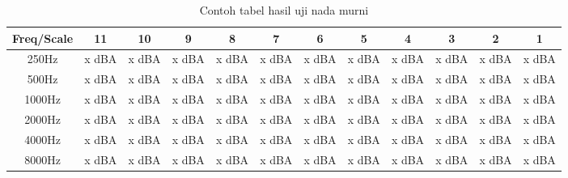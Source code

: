 \documentclass[12pt]{book}
\begin{document}
	\begin{table}[!ht]
		\centering
		\begin{tabular}{|c|c|c|c|c|c|c|c|c|c|c|c|}
			\hline
			Freq/Scale & 11 & 10 & 9 & 8 & 7 & 6 & 5 & 4 & 3 & 2 & 1\\ [0.5ex]
			\hline\hline
			250Hz & x dBA & x dBA & x dBA & x dBA & x dBA & x dBA & x dBA & x dBA & x dBA & x dBA & x dBA\\
			\hline
			500Hz & x dBA & x dBA & x dBA & x dBA & x dBA & x dBA & x dBA & x dBA & x dBA & x dBA & x dBA\\
			\hline
			1000Hz & x dBA & x dBA & x dBA & x dBA & x dBA & x dBA & x dBA & x dBA & x dBA & x dBA & x dBA\\
			\hline
			2000Hz & x dBA & x dBA & x dBA & x dBA & x dBA & x dBA & x dBA & x dBA & x dBA & x dBA & x dBA\\
			\hline
			4000Hz & x dBA & x dBA & x dBA & x dBA & x dBA & x dBA & x dBA & x dBA & x dBA & x dBA & x dBA\\
			\hline
			8000Hz & x dBA & x dBA & x dBA & x dBA & x dBA & x dBA & x dBA & x dBA & x dBA & x dBA & x dBA\\
			\hline
		\end{tabular}
		\caption{Contoh tabel hasil uji nada murni}
	\end{table}
\end{document}
